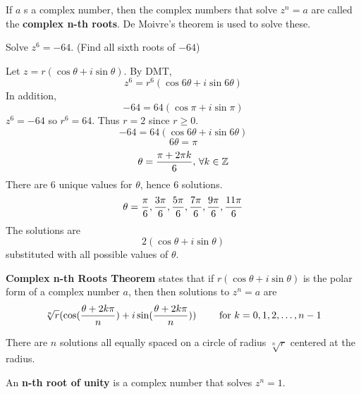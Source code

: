\documentclass[english, 12pt]{article}
\begin{document}
\begin{defn}
If $a$ s a complex number, then the complex numbers that solve $z^n=a$ are called the \textbf{complex n-th roots}. De Moivre's theorem is used to solve these.
\end{defn}
\begin{exmp}
Solve $z^6 = -64$. (Find all sixth roots of $-64$)
\begin{sol}
Let $z = r (\cos \theta + i \sin \theta)$. By DMT,
\[ z^6 = r^6 (\cos 6\theta + i \sin 6\theta)\]
In addition,
\[ -64 = 64 (\cos \pi + i \sin \pi)\]
$z^6 = -64$ so $r^6 = 64$. Thus $r = 2$ since $r \geq 0$.
\[-64 = 64(\cos 6\theta + i \sin 6 \theta)\]
\[ 6 \theta = \pi\]
\[ \theta = \frac{\pi + 2 \pi k}{6}, \, \forall k \in {\mathbb{Z}}\]
There are $6$ unique values for $\theta$, hence $6$ solutions.
\[ \theta = \frac{\pi}{6}, \frac{3\pi}{6},\frac{5\pi}{6},\frac{7\pi}{6},\frac{9\pi}{6},\frac{11\pi}{6}\]
The solutions are 
\[ 2 (\cos \theta + i \sin \theta)\]
substituted with all possible values of $\theta$.
\end{sol}
\end{exmp}
\begin{thrm}[CNRT]
\textbf{Complex n-th Roots Theorem} states that if $r (\cos \theta + i \sin \theta)$ is the polar form of a complex number $a$, then then solutions to $z^n = a$ are
\[\sqrt[n]{r} (\cos (\frac{\theta + 2k\pi}{n}) + i \sin (\frac{\theta + 2k\pi}{n})) \qquad \text{ for } k = 0,1,2,\dots,n-1\]
\begin{note}
There are $n$ solutions all equally spaced on a circle of radius $\sqrt[n]{r}$ centered at the radius.
\end{note}
\end{thrm}
\begin{defn}
An \textbf{n-th root of unity} is a complex number that solves $z^n=1$.
\end{defn}
\end{document}
